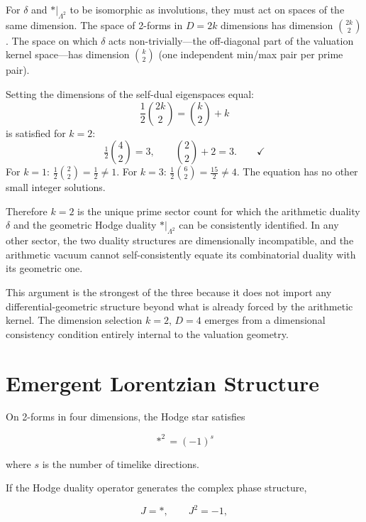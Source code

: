 \documentclass[11pt]{article}
\begin{document}
For $\delta$ and $*|_{\Lambda^2}$ to be isomorphic as involutions, they must act on
spaces of the same dimension.
The space of 2-forms in $D=2k$ dimensions has dimension $\binom{2k}{2}$.
The space on which $\delta$ acts non-trivially---the off-diagonal part of the
valuation kernel space---has dimension $\binom{k}{2}$ (one independent min/max pair
per prime pair).

Setting the dimensions of the self-dual eigenspaces equal:
\begin{equation}
\frac{1}{2}\binom{2k}{2} = \binom{k}{2} + k
\end{equation}
is satisfied for $k=2$:
\begin{equation}
\tfrac{1}{2}\binom{4}{2} = 3, \qquad \binom{2}{2} + 2 = 3. \qquad \checkmark
\end{equation}
For $k=1$: $\frac{1}{2}\binom{2}{2}=\frac{1}{2}\neq 1$.
For $k=3$: $\frac{1}{2}\binom{6}{2}=\frac{15}{2}\neq 4$.
The equation has no other small integer solutions.

Therefore $k=2$ is the unique prime sector count for which the arithmetic duality
$\delta$ and the geometric Hodge duality $*|_{\Lambda^2}$ can be consistently identified.
In any other sector, the two duality structures are dimensionally incompatible, and the
arithmetic vacuum cannot self-consistently equate its combinatorial duality with its
geometric one.

\begin{remark}
This argument is the strongest of the three because it does not import any
differential-geometric structure beyond what is already forced by the arithmetic
kernel. The dimension selection $k=2$, $D=4$ emerges from a dimensional consistency
condition entirely internal to the valuation geometry.
\end{remark}

\section{Emergent Lorentzian Structure}

On 2-forms in four dimensions, the Hodge star satisfies

\begin{equation}
*^2 = (-1)^s
\end{equation}

where $s$ is the number of timelike directions.

If the Hodge duality operator generates the complex phase structure,

\begin{equation}
J=*,
\qquad
J^2=-1,
\end{equation}
\end{document}
